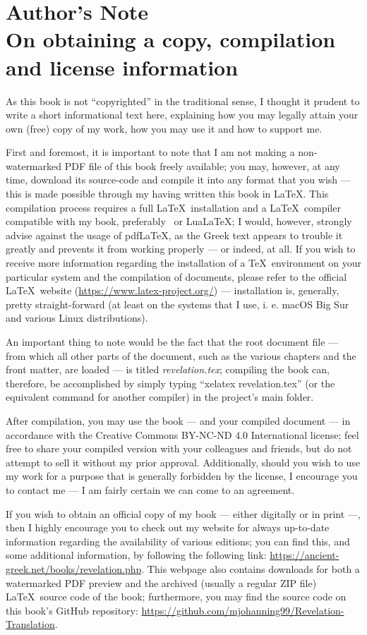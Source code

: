 \chapter*{Author's Note  \\ \large On obtaining a copy, compilation and license information}

As this book is not “copyrighted” in the traditional sense, I thought it prudent to write a short informational text here, explaining how you may legally attain your own (free) copy of my work, how you may use it and how to support me. 

First and foremost, it is important to note that I am not making a non-watermarked PDF file of this book freely available; you may, however, at any time, download its source-code and compile it into any format that you wish — this is made possible through my having written this book in \LaTeX. This compilation process requires a full \LaTeX\ installation and a \LaTeX\ compiler compatible with my book, preferably \XeLaTeX\ or Lua\LaTeX; I would, however, strongly advise against the usage of pdf\LaTeX, as the Greek text appears to trouble it greatly and prevents it from working properly — or indeed, at all. If you wish to receive more information regarding the installation of a \TeX\ environment on your particular system and the compilation of documents, please refer to the official \LaTeX\ website (\url{https://www.latex-project.org/}) — installation is, generally, pretty straight-forward (at least on the systems that I use, i. e. macOS Big Sur and various Linux distributions). 

An important thing to note would be the fact that the root document file — from which all other parts of the document, such as the various chapters and the front matter, are loaded — is titled \textit{revelation.tex}; compiling the book can, therefore, be accomplished by simply typing “xelatex revelation.tex” (or the equivalent command for another compiler) in the project's main folder. 

After compilation, you may use the book — and your compiled document — in accordance with the Creative Commons BY-NC-ND 4.0 International license; feel free to share your compiled version with your colleagues and friends, but do not attempt to sell it without my prior approval. Additionally, should you wish to use my work for a purpose that is generally forbidden by the license, I encourage you to contact me — I am fairly certain we can come to an agreement.

If you wish to obtain an official copy of my book — either digitally or in print —, then I highly encourage you to check out my website for always up-to-date information regarding the availability of various editions; you can find this, and some additional information, by following the following link: \url{https://ancient-greek.net/books/revelation.php}. This webpage also contains downloads for both a watermarked PDF preview and the archived (usually a regular ZIP file) \LaTeX\ source code of the book; furthermore, you may find the source code on this book’s GitHub repository: \url{https://github.com/mjohanning99/Revelation-Translation}.